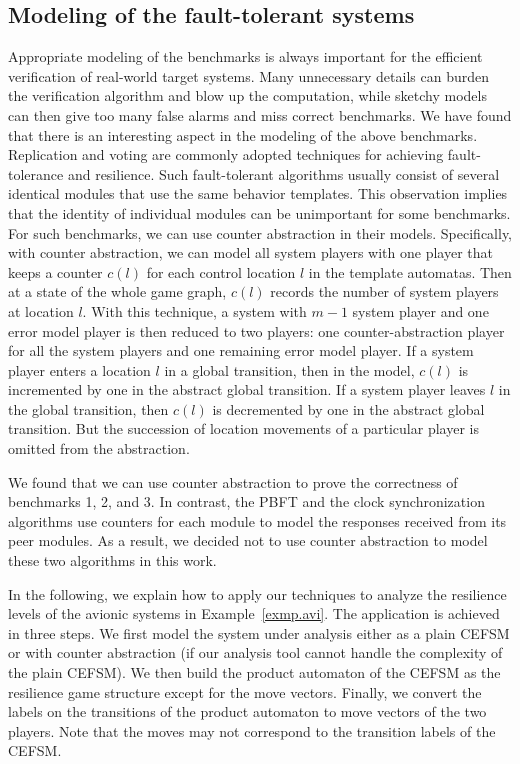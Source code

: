 \documentclass[times,10pt,twocolumn]{article}
\begin{document}
\subsection{Modeling of the fault-tolerant systems 
\label{subsec.models}
} 

Appropriate modeling of the benchmarks is always important for 
the efficient verification of real-world target systems. 
Many unnecessary details can burden the verification algorithm 
and blow up the computation, 
while sketchy models can then give too many false alarms 
and miss correct benchmarks.  
We have found that there is an interesting aspect 
in the modeling of the above benchmarks.  
Replication and voting are commonly adopted techniques for 
achieving fault-tolerance and resilience.  
Such fault-tolerant algorithms usually consist of 
several identical modules that use the same behavior templates.  
This observation implies that the identity of individual modules 
can be unimportant for some benchmarks.  
For such benchmarks, we can use counter abstraction 
\cite{ET99,Lubachevsky84} in their models.  
\label{reply1.counter.abstraction} 
Specifically, with counter abstraction, 
we can model all system players with one player that keeps a counter $c(l)$ 
for each control location $l$ in the template automatas. 
Then at a state of the whole game graph, 
$c(l)$ records the number of system players at location $l$.  
With this technique, a system with $m-1$ system player and one error model player is 
then reduced to two players: one counter-abstraction player for all the system players and one 
remaining error model player. 
If a system player enters a location $l$ in a global transition, 
then in the model, $c(l)$ is incremented by one in the abstract global transition. 
If a system player leaves $l$ in the global transition, 
then $c(l)$ is decremented by one in the abstract global transition.  
But the succession of location movements of a particular player is omitted from the abstraction. 
 

We found that we can use counter abstraction to 
prove the correctness of benchmarks 1, 2, and 3. 
In contrast, the PBFT and the clock synchronization algorithms use 
counters for each module to model the responses received 
from its peer modules. 
As a result, we decided not to use counter abstraction to model 
these two algorithms in this work. 

In the following, we explain how to apply our techniques to analyze 
the resilience levels of the avionic systems 
in Example~\ref{exmp.avi}.  
The application is achieved in three steps.\label{reply2.3step.model} 
We first model the system under analysis either as a plain CEFSM or with counter abstraction (if our analysis tool cannot handle the complexity of the plain CEFSM).
We then build the product automaton of the CEFSM as the resilience 
game structure except for the move vectors.  
Finally, we convert the labels on the transitions of the product automaton to 
move vectors of the two players. 
Note that the moves may not correspond to the transition labels of the CEFSM.  
\end{document}
